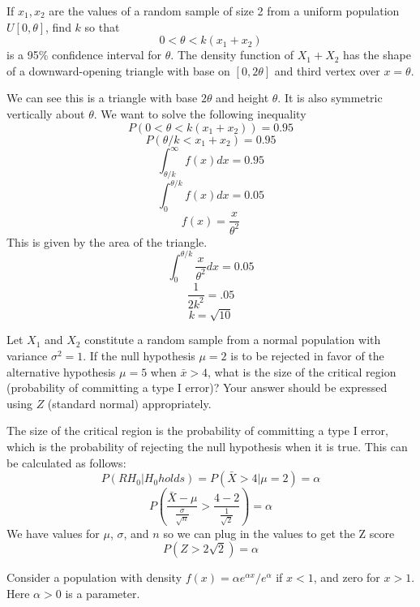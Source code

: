 \documentclass[answers,12pt,addpoints]{exam}
\begin{document}
\begin{questions}
    \question[10] If $x_1, x_2$ are the values of a random sample of size 2 from a uniform population $U[0, \theta]$, find $k$ so that
    $$0 < \theta < k(x_1 + x_2)$$  is a 95\% confidence interval for $\theta$.
    The density function of $X_1 + X_2$ has the shape of a downward-opening triangle with base on $[0, 2\theta]$ and third vertex over $x = \theta$.
    \begin{solution}
        We can see this is a triangle with base $2\theta$ and height $\theta$. It is also symmetric vertically about $\theta$. 
        We want to solve the following inequality
        $$ P(0 < \theta < k(x_1 + x_2)) = 0.95$$
        $$ P(\theta/k < x_1 + x_2 ) = 0.95$$
        $$ \int_{\theta/k}^\infty f(x) dx = 0.95$$
        $$ \int_0^{\theta/k} f(x) dx = 0.05$$
        $$f(x) = \frac{x}{\theta^2}$$   
        This is given by the area of the triangle. 
        $$ \int_0^{\theta/k} \frac{x}{\theta^2} dx = 0.05$$
        $$ \frac{1}{2k^2} = .05$$
        $$ k = \sqrt{10}$$ 
    \end{solution}
    \question[10] Let $X_1$ and $X_2$ constitute a random sample from a normal population with variance $\sigma^2 = 1$. If the null hypothesis $\mu = 2$ is to be rejected in favor of the alternative hypothesis $\mu = 5$ when $\bar{x} > 4$, what is the size of the critical region (probability of committing a type I error)? Your answer should be expressed using $Z$ (standard normal) appropriately.
    \begin{solution}
        The size of the critical region is the probability of committing a type I error, which is the probability of rejecting the null hypothesis when it is true. This can be calculated as follows:
        $$P(R H_0 | H_0 holds) = P(\bar{X} > 4 | \mu = 2) = \alpha$$
        $$ P\left( \frac{\bar{X} - \mu}{\frac{\sigma}{\sqrt{n}}} > \frac{4 - 2}{\frac{1}{\sqrt{2}}} \right) = \alpha$$
        We have values for $\mu$, $\sigma$, and $n$ so we can plug in the values to get the Z score
        $$ P(Z > 2\sqrt{2}) = \alpha$$
    \end{solution}

    \question[10] Consider a population with density $f(x) = \alpha e^{\alpha x} / e^{\alpha}$ if $x < 1$, and zero for $x > 1$. Here $\alpha > 0$ is a parameter.
\end{questions}
\end{document}

